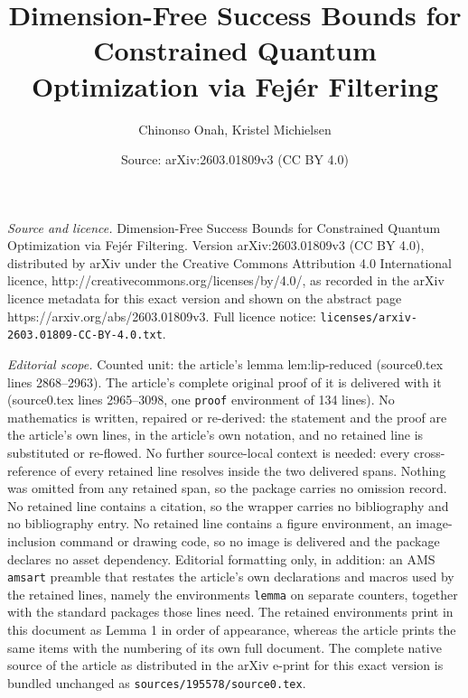 \documentclass[10pt,a4paper]{amsart}
\title{Dimension-Free Success Bounds for Constrained Quantum Optimization via Fejér Filtering}
\author{Chinonso Onah, Kristel Michielsen}
\date{Source: arXiv:2603.01809v3 (CC BY 4.0)}
\begin{document}
\maketitle

\noindent\emph{Source and licence.} Dimension-Free Success Bounds for Constrained Quantum Optimization via Fejér Filtering. Version arXiv:2603.01809v3 (CC BY 4.0), distributed by arXiv under the Creative Commons Attribution 4.0 International licence, http://creativecommons.org/licenses/by/4.0/, as recorded in the arXiv licence metadata for this exact version and shown on the abstract page https://arxiv.org/abs/2603.01809v3. Full licence notice: \texttt{licenses/arxiv-2603.01809-CC-BY-4.0.txt}.\par\smallskip

\noindent\textit{Editorial scope.} Counted unit: the article's lemma lem:lip-reduced (source0.tex lines 2868--2963). The article's complete original proof of it is delivered with it (source0.tex lines 2965--3098, one \texttt{proof} environment of 134 lines). No mathematics is written, repaired or re-derived: the statement and the proof are the article's own lines, in the article's own notation, and no retained line is substituted or re-flowed.  No further source-local context is needed: every cross-reference of every retained line resolves inside the two delivered spans.  Nothing was omitted from any retained span, so the package carries no omission record.  No retained line contains a citation, so the wrapper carries no bibliography and no bibliography entry.  No retained line contains a figure environment, an image-inclusion command or drawing code, so no image is delivered and the package declares no asset dependency.  Editorial formatting only, in addition: an AMS \texttt{amsart} preamble that restates the article's own declarations and macros used by the retained lines, namely the environments \texttt{lemma} on separate counters, together with the standard packages those lines need.  The retained environments print in this document as Lemma 1 in order of appearance, whereas the article prints the same items with the numbering of its own full document.  The complete native source of the article as distributed in the arXiv e-print for this exact version is bundled unchanged as \texttt{sources/195578/source0.tex}.
\end{document}
